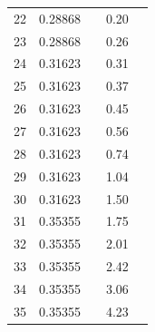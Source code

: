\begin {tabular}{|rrrrr|}
   22  &      0.28868 &             &      0.20 \\
   23  &      0.28868 &             &      0.26 \\
   24  &      0.31623 &             &      0.31 \\
   25  &      0.31623 &             &      0.37 \\
   26  &      0.31623 &             &      0.45 \\
   27  &      0.31623 &             &      0.56 \\
   28  &      0.31623 &             &      0.74 \\
   29  &      0.31623 &             &      1.04 \\
   30  &      0.31623 &             &      1.50 \\
   31  &      0.35355 &             &      1.75 \\
   32  &      0.35355 &             &      2.01 \\
   33  &      0.35355 &             &      2.42 \\
   34  &      0.35355 &             &      3.06 \\
   35  &      0.35355 &             &      4.23 \\
\hline
\end {tabular}
